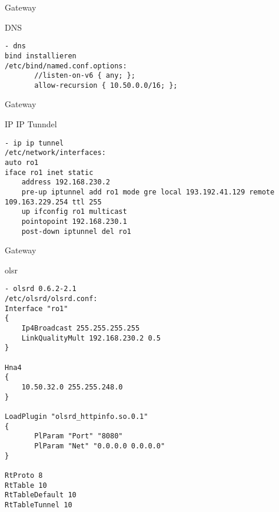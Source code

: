 \begin{frame}[fragile]{Gateway}
    \begin{block}{DNS}
        \begin{lstlisting}
- dns
bind installieren
/etc/bind/named.conf.options:
       //listen-on-v6 { any; };
       allow-recursion { 10.50.0.0/16; };
        \end{lstlisting}
    \end{block}
\end{frame}

\begin{frame}[fragile]{Gateway}
    \begin{block}{IP IP Tunndel}
        \begin{lstlisting}
- ip ip tunnel
/etc/network/interfaces:
auto ro1
iface ro1 inet static
    address 192.168.230.2
    pre-up iptunnel add ro1 mode gre local 193.192.41.129 remote 109.163.229.254 ttl 255
    up ifconfig ro1 multicast
    pointopoint 192.168.230.1
    post-down iptunnel del ro1
        \end{lstlisting}
    \end{block}
\end{frame}

\begin{frame}[fragile]{Gateway}
    \begin{block}{olsr}
        \begin{lstlisting}
- olsrd 0.6.2-2.1
/etc/olsrd/olsrd.conf:
Interface "ro1"
{
    Ip4Broadcast 255.255.255.255
    LinkQualityMult 192.168.230.2 0.5
}

Hna4
{
    10.50.32.0 255.255.248.0
}

LoadPlugin "olsrd_httpinfo.so.0.1"
{
       PlParam "Port" "8080"
       PlParam "Net" "0.0.0.0 0.0.0.0"
}

RtProto 8
RtTable 10
RtTableDefault 10
RtTableTunnel 10
        \end{lstlisting}
    \end{block}
\end{frame}

